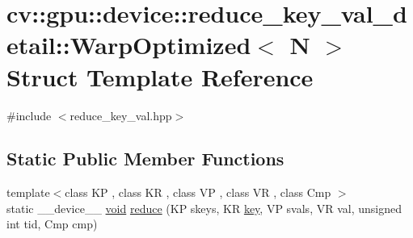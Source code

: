 \hypertarget{structcv_1_1gpu_1_1device_1_1reduce__key__val__detail_1_1WarpOptimized}{\section{cv\-:\-:gpu\-:\-:device\-:\-:reduce\-\_\-key\-\_\-val\-\_\-detail\-:\-:Warp\-Optimized$<$ N $>$ Struct Template Reference}
\label{structcv_1_1gpu_1_1device_1_1reduce__key__val__detail_1_1WarpOptimized}
}


{\ttfamily \#include $<$reduce\-\_\-key\-\_\-val.\-hpp$>$}

\subsection*{Static Public Member Functions}
\begin{DoxyCompactItemize}
\item 
{\footnotesize template$<$class K\-P , class K\-R , class V\-P , class V\-R , class Cmp $>$ }\\static \-\_\-\-\_\-device\-\_\-\-\_\- \hyperlink{legacy_8hpp_a8bb47f092d473522721002c86c13b94e}{void} \hyperlink{structcv_1_1gpu_1_1device_1_1reduce__key__val__detail_1_1WarpOptimized_ad98772f4a08c909ead2e5aa8f95e8a4b}{reduce} (K\-P skeys, K\-R \hyperlink{core__c_8h_a68cf695b604d08c0b6f6f6bb282a6586}{key}, V\-P svals, V\-R val, unsigned int tid, Cmp cmp)
\end{DoxyCompactItemize}


